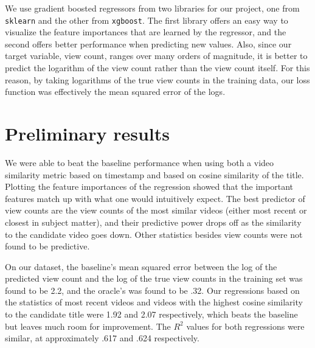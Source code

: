 \documentclass[12pt]{article}
\theoremstyle{definition}
\theoremstyle{remark}
\begin{document}
We use gradient boosted regressors from two libraries for our project, one from
\texttt{sklearn} and the other from \texttt{xgboost}. The first library offers
an easy way to visualize the feature importances that are learned by the
regressor, and the second offers better performance when predicting new values.
Also, since our target variable, view count, ranges over many orders of
magnitude, it is better to predict the logarithm of the view count rather than
the view count itself. For this reason, by taking logarithms of the true view
counts in the training data, our loss function was effectively the mean squared
error of the logs.

\section{Preliminary results}

We were able to beat the baseline performance when using both a video similarity
metric based on timestamp and based on cosine similarity of the title. Plotting
the feature importances of the regression showed that the important features
match up with what one would intuitively expect. The best predictor of view
counts are the view counts of the most similar videos (either most recent or
closest in subject matter), and their predictive power drops off as the
similarity to the candidate video goes down. Other statistics besides view
counts were not found to be predictive.

On our dataset, the baseline's mean squared error between the log of the
predicted view count and the log of the true view counts in the training set was
found to be 2.2, and the oracle's was found to be .32. Our regressions based on
the statistics of most recent videos and videos with the highest cosine
similarity to the candidate title were 1.92 and 2.07 respectively, which beats
the baseline but leaves much room for improvement. The $R^2$ values for both
regressions were similar, at approximately .617 and .624 respectively.
\end{document}
